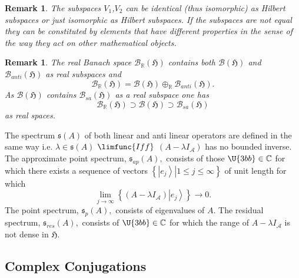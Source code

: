 \documentclass[aps,preprint]{revtex4}
\newtheorem{remark}[theorem]{Remark}
\begin{document}
\begin{remark}
The subspaces $V_{1}$,$V_{2}$ can be identical (thus isomorphic) as Hilbert
subspaces or just isomorphic as Hilbert subspaces. If the subspaces are not
equal they can be constituted by elements that have different properties in
the sense of the way they act on other mathematical objects.
\end{remark}

\begin{remark}
The real Banach space $\mathcal{B}_{\mathbb{R}}\left( \mathfrak{H}\right) $
contains both $\mathcal{B}\left( \mathfrak{H}\right) $ and $\mathcal{B}%
_{anti}\left( \mathfrak{H}\right) $ as real subspaces and 
\begin{equation}
\mathcal{B}_{\mathbb{R}}\left( \mathfrak{H}\right) =\mathcal{B}\left( 
\mathfrak{H}\right) \oplus _{\mathbb{R}}\mathcal{B}_{anti}\left( \mathfrak{H}%
\right) .
\end{equation}%
As $\mathcal{B}\left( \mathfrak{H}\right) $ contains $\mathcal{B}_{sa}\left( 
\mathfrak{H}\right) $ as a real subspace one has 
\begin{equation}
\mathcal{B}_{\mathbb{R}}\left( \mathfrak{H}\right) \supset \mathcal{B}\left( 
\mathfrak{H}\right) \supset \mathcal{B}_{sa}\left( \mathfrak{H}\right)
\end{equation}%
as real spaces.
\end{remark}

The spectrum $\mathfrak{s}\left( A\right) $ of both linear and anti linear
operators are defined in the same way i.e. $\lambda\in\mathfrak{s}\left(
A\right) $ $\limfunc{Iff}$ $\left( A-\lambda I_{\mathcal{A}}\right) $ has no
bounded inverse. The approximate point spectrum, $\mathfrak{s}_{ap}(A),$
consists of those $\U{3bb} \in\mathbb{C}$ for which there exists a sequence
of vectors $\left\{ \left. \left\vert e_{j}\right\rangle \right\vert 1\leq
j\leq\infty\right\} $ of unit length for which 
\begin{equation}
\lim\limits_{j\rightarrow\infty}\left\{ \left( A-\lambda I_{\mathcal{A}%
}\right) \left\vert e_{j}\right\rangle \right\} \rightarrow0.
\end{equation}
The point spectrum, $\mathfrak{s}_{p}(A),$ consists of eigenvalues of $A$.
The residual spectrum, $\mathfrak{s}_{res}(A),$ consists of $\U{3bb} \in 
\mathbb{C}$ for which the range of $A-\lambda I_{\mathcal{A}}$ is not dense
in $\mathfrak{H}$.

\subsection{Complex Conjugations}
\end{document}
